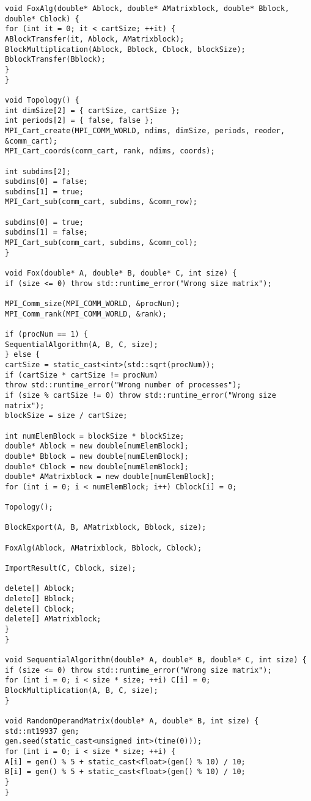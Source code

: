 \documentclass{report}
\begin{document}
\begin{lstlisting}
void FoxAlg(double* Ablock, double* AMatrixblock, double* Bblock,
double* Cblock) {
for (int it = 0; it < cartSize; ++it) {
ABlockTransfer(it, Ablock, AMatrixblock);
BlockMultiplication(Ablock, Bblock, Cblock, blockSize);
BblockTransfer(Bblock);
}
}

void Topology() {
int dimSize[2] = { cartSize, cartSize };
int periods[2] = { false, false };
MPI_Cart_create(MPI_COMM_WORLD, ndims, dimSize, periods, reoder, &comm_cart);
MPI_Cart_coords(comm_cart, rank, ndims, coords);

int subdims[2];
subdims[0] = false;
subdims[1] = true;
MPI_Cart_sub(comm_cart, subdims, &comm_row);

subdims[0] = true;
subdims[1] = false;
MPI_Cart_sub(comm_cart, subdims, &comm_col);
}

void Fox(double* A, double* B, double* C, int size) {
if (size <= 0) throw std::runtime_error("Wrong size matrix");

MPI_Comm_size(MPI_COMM_WORLD, &procNum);
MPI_Comm_rank(MPI_COMM_WORLD, &rank);

if (procNum == 1) {
SequentialAlgorithm(A, B, C, size);
} else {
cartSize = static_cast<int>(std::sqrt(procNum));
if (cartSize * cartSize != procNum)
throw std::runtime_error("Wrong number of processes");
if (size % cartSize != 0) throw std::runtime_error("Wrong size matrix");
blockSize = size / cartSize;

int numElemBlock = blockSize * blockSize;
double* Ablock = new double[numElemBlock];
double* Bblock = new double[numElemBlock];
double* Cblock = new double[numElemBlock];
double* AMatrixblock = new double[numElemBlock];
for (int i = 0; i < numElemBlock; i++) Cblock[i] = 0;

Topology();

BlockExport(A, B, AMatrixblock, Bblock, size);

FoxAlg(Ablock, AMatrixblock, Bblock, Cblock);

ImportResult(C, Cblock, size);

delete[] Ablock;
delete[] Bblock;
delete[] Cblock;
delete[] AMatrixblock;
}
}

void SequentialAlgorithm(double* A, double* B, double* C, int size) {
if (size <= 0) throw std::runtime_error("Wrong size matrix");
for (int i = 0; i < size * size; ++i) C[i] = 0;
BlockMultiplication(A, B, C, size);
}

void RandomOperandMatrix(double* A, double* B, int size) {
std::mt19937 gen;
gen.seed(static_cast<unsigned int>(time(0)));
for (int i = 0; i < size * size; ++i) {
A[i] = gen() % 5 + static_cast<float>(gen() % 10) / 10;
B[i] = gen() % 5 + static_cast<float>(gen() % 10) / 10;
}
}
\end{lstlisting}
\end{document}
